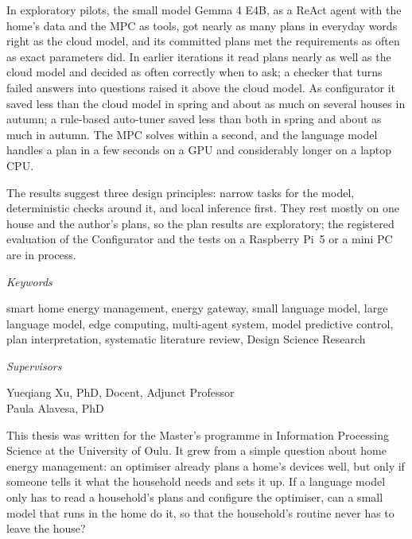 In exploratory pilots, the small model Gemma 4 E4B, as a ReAct agent
with the home's data and the MPC as tools, got nearly as many plans in
everyday words right as the cloud model, and its committed plans met
the requirements as often as exact parameters did. In earlier
iterations it read plans nearly as well as the cloud model and decided
as often correctly when to ask; a checker that turns failed answers
into questions raised it above the cloud model. As
configurator it saved less than the cloud model in spring and about as
much on several houses in autumn; a rule-based auto-tuner saved less than
both in spring and about as much in autumn. The MPC
solves within a second, and the language model handles a plan in a few
seconds on a GPU and considerably longer on a laptop CPU.

The results suggest three design principles: narrow tasks for the
model, deterministic checks around it, and local inference first. They
rest mostly on one house and the author's plans, so the plan results are
exploratory; the registered evaluation of the Configurator and the
tests on a Raspberry Pi~5 or a mini PC are in process.

\clearpage
{\sffamily\itshape Keywords}

\vspace{4pt}
smart home energy management, energy gateway, small language model, large
language model, edge computing, multi-agent system, model predictive
control, plan interpretation, systematic literature review, Design
Science Research

\vspace{12pt}
{\sffamily\itshape Supervisors}

\vspace{4pt}
Yueqiang Xu, PhD, Docent, Adjunct Professor\\
Paula Alavesa, PhD


This thesis was written for the Master's programme in Information
Processing Science at the University of Oulu. It grew from a simple
question about home energy management: an optimiser already plans a
home's devices well, but only if someone tells it what the household
needs and sets it up. If a language model only has to read a
household's plans and configure the optimiser, can a small model that
runs in the home do it, so that the household's routine never has to
leave the house?

